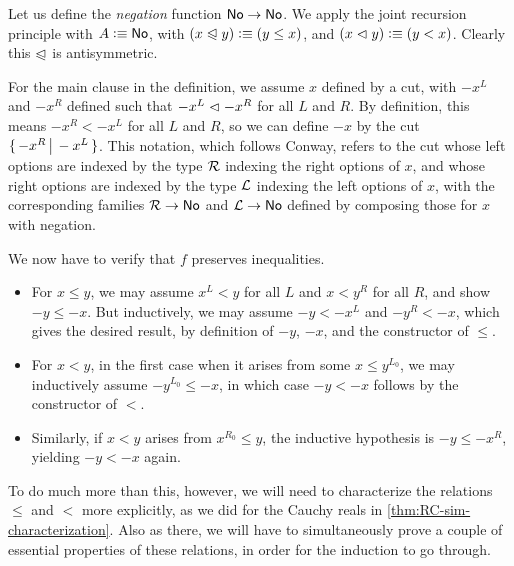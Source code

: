 \begin{eg}
  Let us define the \emph{negation} function $\mathsf{No}\to\mathsf{No}$.
  We apply the joint recursion principle with $A\vcentcolon\equiv\mathsf{No}$, with $(x\trianglelefteqslant y)\vcentcolon\equiv (y\le x)$, and $(x\vartriangleleft y)\vcentcolon\equiv (y< x)$.
  Clearly this $\trianglelefteqslant$ is antisymmetric.

  For the main clause in the definition, we assume $x$ defined by a cut, with $-x^L$ and $-x^R$ defined such that $-x^L \vartriangleleft -x^R$ for all $L$ and $R$.
  By definition, this means $-x^R< -x^L$ for all $L$ and $R$, so we can define $-x$ by the cut $\{\,-x^R\,\big|\,-x^L\,\}$.
  This notation, which follows Conway, refers to the cut whose left options are indexed by the type $\mathcal{R}$ indexing the right options of $x$, and whose right options are indexed by the type $\mathcal{L}$ indexing the left options of $x$, with the corresponding families $\mathcal{R}\to\mathsf{No}$ and $\mathcal{L}\to\mathsf{No}$ defined by composing those for $x$ with negation.

  We now have to verify that $f$ preserves inequalities.
  \begin{itemize}
  \item For $x\le y$, we may assume $x^L<y$ for all $L$ and $x < y^R$ for all $R$, and show $-y\le -x$.
    But inductively, we may assume $-y <-x^L$ and $-y^R<-x$, which gives the desired result, by definition of $-y$, $-x$, and the constructor of $\le$.
  \item For $x<y$, in the first case when it arises from some $x\le y^{L_0}$, we may inductively assume $-y^{L_0} \le -x$, in which case $-y<-x$ follows by the constructor of $<$.
  \item Similarly, if $x<y$ arises from $x^{R_0}\le y$, the inductive hypothesis is $-y \le -x^R$, yielding $-y<-x$ again.
  \end{itemize}
\end{eg}

To do much more than this, however, we will need to characterize the relations $\le$ and $<$ more explicitly, as we did for the Cauchy reals in \cref{thm:RC-sim-characterization}.
Also as there, we will have to simultaneously prove a couple of essential properties of these relations, in order for the induction to go through.

